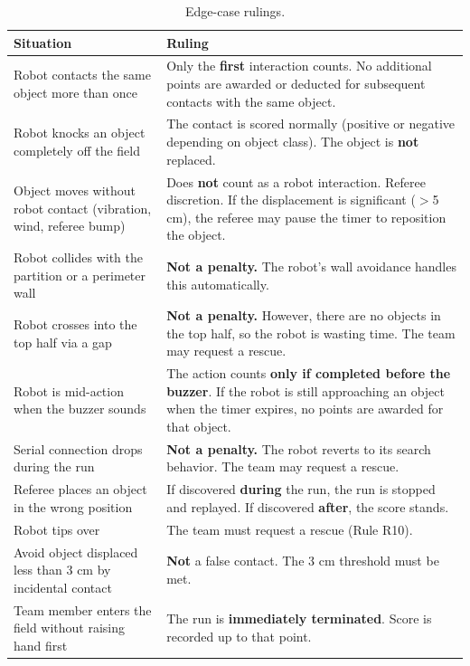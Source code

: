 \documentclass[a4]{article}
\begin{document}
\begin{table}[H]
\centering
\begin{tabular}{p{5cm}p{8cm}}
\toprule
\textbf{Situation} & \textbf{Ruling} \\
\midrule
Robot contacts the same object more than once & Only the \textbf{first} interaction counts. No additional points are awarded or deducted for subsequent contacts with the same object. \\
\addlinespace
Robot knocks an object completely off the field & The contact is scored normally (positive or negative depending on object class). The object is \textbf{not} replaced. \\
\addlinespace
Object moves without robot contact (vibration, wind, referee bump) & Does \textbf{not} count as a robot interaction. Referee discretion. If the displacement is significant ($>$5 cm), the referee may pause the timer to reposition the object. \\
\addlinespace
Robot collides with the partition or a perimeter wall & \textbf{Not a penalty.} The robot's wall avoidance handles this automatically. \\
\addlinespace
Robot crosses into the top half via a gap & \textbf{Not a penalty.} However, there are no objects in the top half, so the robot is wasting time. The team may request a rescue. \\
\addlinespace
Robot is mid-action when the buzzer sounds & The action counts \textbf{only if completed before the buzzer}. If the robot is still approaching an object when the timer expires, no points are awarded for that object. \\
\addlinespace
Serial connection drops during the run & \textbf{Not a penalty.} The robot reverts to its search behavior. The team may request a rescue. \\
\addlinespace
Referee places an object in the wrong position & If discovered \textbf{during} the run, the run is stopped and replayed. If discovered \textbf{after}, the score stands. \\
\addlinespace
Robot tips over & The team must request a rescue (Rule R10). \\
\addlinespace
Avoid object displaced less than 3 cm by incidental contact & \textbf{Not} a false contact. The 3 cm threshold must be met. \\
\addlinespace
Team member enters the field without raising hand first & The run is \textbf{immediately terminated}. Score is recorded up to that point. \\
\bottomrule
\end{tabular}
\caption{Edge-case rulings.}
\end{table}
\end{document}
